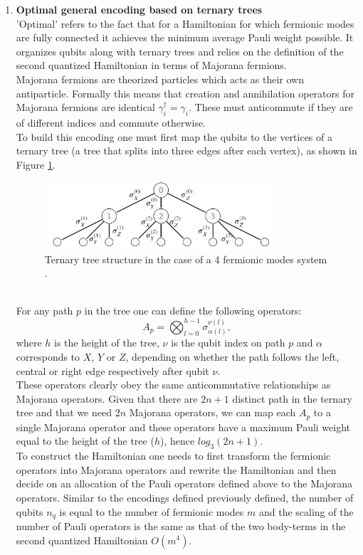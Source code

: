 \begin{enumerate}
    \item \textbf{Optimal general encoding based on ternary trees} \\
    'Optimal' refers to the fact that for a Hamiltonian for which fermionic modes are fully connected it achieves the minimum average Pauli weight possible. It organizes qubits along with ternary trees and relies on the definition of the second quantized Hamiltonian in terms of Majorana fermions. \\
    Majorana fermions are theorized particles which acts as their own antiparticle. Formally this means that creation and annihilation operators for Majorana fermions are identical $\gamma^{\dagger}_i = \gamma_i$. These must anticommute if they are of different indices and commute otherwise. \\
    To build this encoding one must first map the qubits to the vertices of a ternary tree (a tree that splits into three edges after each vertex), as shown in Figure \ref{Ternary tree}. 
    \begin{figure}[ht]
    \centering
    \includegraphics[width=0.8\textwidth]{figures/Ternary tree.png}
    \caption{Ternary tree structure in the case of a 4 fermionic modes system \cite{Tilly2021Nov}.} \label{Ternary tree}
    \end{figure} \\
    For any path $p$ in the tree one can define the following operators:
    \begin{equation}
        A_p = \bigotimes_{l=0}^{h-1} \sigma_{\alpha(l)}^{\nu(l)},
    \end{equation}
    where $h$ is the height of the tree, $\nu$ is the qubit index on path $p$ and $\alpha$ corresponds to $X$, $Y$ or $Z$, depending on whether the path follows the left, central or right edge respectively after qubit $\nu$. \\
    These operators clearly obey the same anticommutative relationships as Majorana operators. Given that there are $2n+1$ distinct path in the ternary tree and that we need $2n$ Majorana operators, we can map each $A_p$ to a single Majorana operator and these operators have a maximum Pauli weight equal to the height of the tree ($h$), hence $log_3(2n+1)$. \\
    To construct the Hamiltonian one needs to first transform the fermionic operators into Majorana operators and rewrite the Hamiltonian and then decide on an allocation of the Pauli operators defined above to the Majorana operators. Similar to the encodings defined previously defined, the number of qubits $n_q$ is equal to the number of fermionic modes $m$ and the scaling of the number of Pauli operators is the same as that of the two body-terms in the second quantized Hamiltonian $O(m^4)$.
\end{enumerate}

